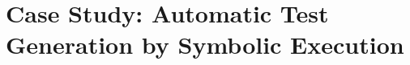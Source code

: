 \section{Case Study: Automatic Test Generation by Symbolic Execution}
\label{sec:case-study}
\newpage